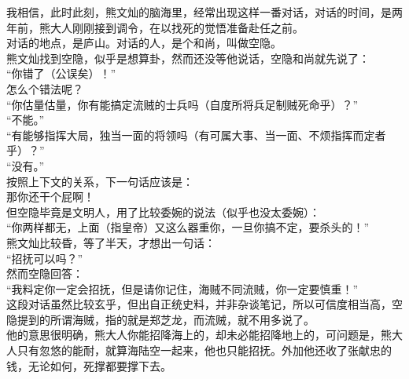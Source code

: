 \begin{multicols}{\theparacolNo}
我相信，此时此刻，熊文灿的脑海里，经常出现这样一番对话，对话的时间，是两年前，熊大人刚刚接到调令，在以找死的觉悟准备赴任之前。\\

对话的地点，是庐山。对话的人，是个和尚，叫做空隐。\\

熊文灿找到空隐，似乎是想算卦，然而还没等他说话，空隐和尚就先说了：\\

“你错了（公误矣）！”\\

怎么个错法呢？\\

“你估量估量，你有能搞定流贼的士兵吗（自度所将兵足制贼死命乎）？”\\

“不能。”\\

“有能够指挥大局，独当一面的将领吗（有可属大事、当一面、不烦指挥而定者乎）？”\\

“没有。”\\

按照上下文的关系，下一句话应该是：\\

那你还干个屁啊！\\

但空隐毕竟是文明人，用了比较委婉的说法（似乎也没太委婉）：\\

“你两样都无，上面（指皇帝）又这么器重你，一旦你搞不定，要杀头的！”\\

熊文灿比较昏，等了半天，才想出一句话：\\

“招抚可以吗？”\\

然而空隐回答：\\

“我料定你一定会招抚，但是请你记住，海贼不同流贼，你一定要慎重！”\\

这段对话虽然比较玄乎，但出自正统史料，并非杂谈笔记，所以可信度相当高，空隐提到的所谓海贼，指的就是郑芝龙，而流贼，就不用多说了。\\

他的意思很明确，熊大人你能招降海上的，却未必能招降地上的，可问题是，熊大人只有忽悠的能耐，就算海陆空一起来，他也只能招抚。外加他还收了张献忠的钱，无论如何，死撑都要撑下去。\\


\end{multicols}
